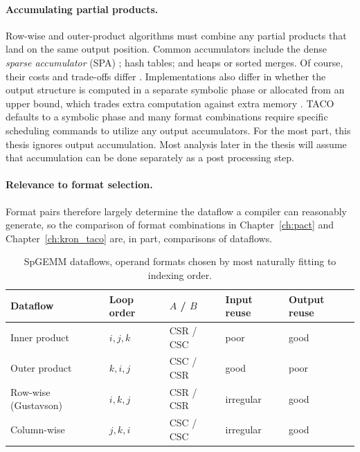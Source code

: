 \paragraph{Accumulating partial products.}
Row-wise and outer-product algorithms must combine any partial products that
land on the same output position. Common accumulators include the dense
\emph{sparse accumulator} (SPA) \cite{gilbert1992matlab}; hash tables; and heaps or sorted
merges. Of course, their costs and trade-offs differ \cite{nagasaka2018highperformance}.
Implementations also differ in whether the
output structure is computed in a separate symbolic phase or
allocated from an upper bound, which trades extra computation against extra memory
\cite{nagasaka2018highperformance}. TACO defaults to a symbolic phase and many format combinations require specific
scheduling commands to utilize any output accumulators. For the most part, this thesis ignores output accumulation.
Most analysis later in the thesis will assume that accumulation can be done separately as a post processing step.

\paragraph{Relevance to format selection.}
Format pairs therefore largely determine the dataflow a compiler can reasonably generate,
so the comparison of format combinations in Chapter~\ref{ch:pact} and Chapter~\ref{ch:kron_taco} are, in part,
comparisons of dataflows.

\begin{table}[h]
\centering
\small
\begin{tabular}{lllll}
\hline
\textbf{Dataflow} & \textbf{Loop order} & \textbf{$A$ / $B$} &
\textbf{Input reuse} & \textbf{Output reuse} \\
\hline
Inner product & $i,j,k$ & CSR / CSC & poor & good \\
Outer product & $k,i,j$ & CSC / CSR & good & poor \\
Row-wise (Gustavson) & $i,k,j$ & CSR / CSR & irregular & good \\
Column-wise & $j,k,i$ & CSC / CSC & irregular & good \\
\hline
\end{tabular}
\caption{SpGEMM dataflows, operand formats chosen by most naturally fitting to indexing order.}
\label{tab:dataflows}
\end{table}


